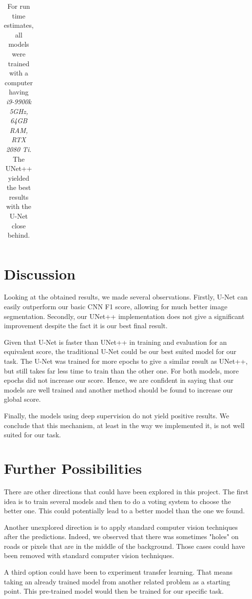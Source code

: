\documentclass[10pt,conference,a4paper]{IEEEtran}
\begin{document}
\begin{table}[h!]
\begin{tabular}{|c|c|c|c|c|c|}
\end{tabular}
\centering
\caption{For run time estimates, all models were trained with a computer having \textit{i9-9900k 5GHz, 64GB RAM, RTX 2080 Ti}. The UNet++ yielded the best results with the U-Net close behind.}
\label{tab:results}
\end{table}

\section{Discussion}

Looking at the obtained results, we made several observations. 
Firstly, U-Net can easily outperform our basic CNN F1 score, allowing for much better image segmentation.
Secondly, our UNet++ implementation does not give a significant improvement despite the fact it is our best final result. 

Given that U-Net is faster than UNet++ in training and evaluation for an equivalent score, the traditional U-Net could be our best suited model for our task.
The U-Net was trained for more epochs to give a similar result as UNet++, but still takes far less time to train than the other one. 
For both models, more epochs did not increase our score.
Hence, we are confident in saying that our models are well trained and another method should be found to increase our global score.

Finally, the models using deep supervision do not yield positive results. 
We conclude that this mechanism, at least in the way we implemented it, is not well suited for our task. 

\section{Further Possibilities}

There are other directions that could have been explored in this project. 
The first idea is to train several models and then to do a voting system to choose the better one.
This could potentially lead to a better model than the one we found.

Another unexplored direction is to apply standard computer vision techniques after the predictions.
Indeed, we observed that there was sometimes "holes" on roads or pixels that are in the middle of the background. Those cases could have been removed with standard computer vision techniques.

A third option could have been to experiment transfer learning.
That means taking an already trained model from another related problem as a starting point. 
This pre-trained model would then be trained for our specific task.
\end{document}
